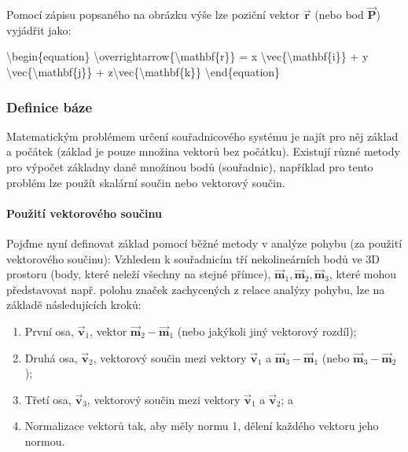 \documentclass[letterpaper,10pt,english]{jupyterBook}
\begin{document}
\sphinxAtStartPar
Pomocí zápisu popsaného na obrázku výše lze poziční vektor \(\overrightarrow{\mathbf{r}}\) (nebo bod \(\overrightarrow{\mathbf{P}}\)) vyjádřit jako:


\textbackslash{}begin\{equation\}
\textbackslash{}overrightarrow\{\textbackslash{}mathbf\{r\}\} = x \textbackslash{}vec\{\textbackslash{}mathbf\{i\}\} + y \textbackslash{}vec\{\textbackslash{}mathbf\{j\}\} + z\textbackslash{}vec\{\textbackslash{}mathbf\{k\}\}
\textbackslash{}end\{equation\}



\subsubsection{Definice báze}
\label{\detokenize{Prednasky/0_3_Sou_u0159adnicov_xe9_syst_xe9my:definice-baze}}
\sphinxAtStartPar
Matematickým problémem určení souřadnicového systému je najít pro něj základ a počátek (základ je pouze množina vektorů bez počátku). Existují různé metody pro výpočet základny dané množinou bodů (souřadnic), například pro tento problém lze použít skalární součin nebo  vektorový součin.


\paragraph{Použití vektorového součinu}
\label{\detokenize{Prednasky/0_3_Sou_u0159adnicov_xe9_syst_xe9my:pouziti-vektoroveho-soucinu}}
\sphinxAtStartPar
Pojďme nyní definovat základ pomocí běžné metody v analýze pohybu (za použití vektorového součinu):
Vzhledem k souřadnicím tří nekolineárních bodů ve 3D prostoru (body, které neleží všechny na stejné přímce), \(\overrightarrow{\mathbf{m}}_1, \overrightarrow{\mathbf{m}}_2, \overrightarrow{\mathbf{m}}_3\), které mohou představovat např. polohu značek zachycených z relace analýzy pohybu, lze na základě následujících kroků:
\begin{enumerate}
%
\item {} 
\sphinxAtStartPar
První osa, \(\overrightarrow{\mathbf{v}}_1\), vektor \(\overrightarrow{\mathbf{m}}_2-\overrightarrow{\mathbf{m}}_1\) (nebo jakýkoli jiný vektorový rozdíl);

\item {} 
\sphinxAtStartPar
Druhá osa, \(\overrightarrow{\mathbf{v}}_2\), vektorový součin mezi vektory \(\overrightarrow{\mathbf{v}}_1\) a \(\overrightarrow{\mathbf{m}}_3-\overrightarrow{\mathbf{m}}_1\) (nebo \(\overrightarrow{\mathbf{m}}_3-\overrightarrow{\mathbf{m}}_2\));

\item {} 
\sphinxAtStartPar
Třetí osa, \(\overrightarrow{\mathbf{v}}_3\), vektorový součin mezi vektory \(\overrightarrow{\mathbf{v}}_1\) a \(\overrightarrow{\mathbf{v}}_2\); a

\item {} 
\sphinxAtStartPar
Normalizace vektorů tak, aby měly normu 1, dělení každého vektoru jeho normou.

\end{enumerate}
\end{document}
